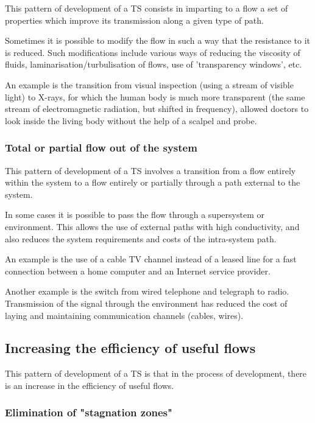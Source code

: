 \documentclass[a4paper,11pt]{article}
\begin{document}
This pattern of development of a TS consists in imparting to a flow a set of
properties which improve its transmission along a given type of path.

Sometimes it is possible to modify the flow in such a way that the resistance
to it is reduced. Such modifications include various ways of reducing the
viscosity of fluids, laminarisation/turbulisation of flows, use of
'transparency windows', etc.

An example is the transition from visual inspection (using a stream of visible
light) to X-rays, for which the human body is much more transparent (the same
stream of electromagnetic radiation, but shifted in frequency), allowed
doctors to look inside the living body without the help of a scalpel and
probe.

\subsubsection{Total or partial flow out of the system}

This pattern of development of a TS involves a transition from a flow entirely
within the system to a flow entirely or partially through a path external to
the system.

In some cases it is possible to pass the flow through a supersystem or
environment. This allows the use of external paths with high conductivity, and
also reduces the system requirements and costs of the intra-system path.

An example is the use of a cable TV channel instead of a leased line for a
fast connection between a home computer and an Internet service provider.

Another example is the switch from wired telephone and telegraph to radio.
Transmission of the signal through the environment has reduced the cost of
laying and maintaining communication channels (cables, wires).

\subsection{Increasing the efficiency of useful flows}

This pattern of development of a TS is that in the process of development,
there is an increase in the efficiency of useful flows.

\subsubsection{Elimination of "stagnation zones"}
\end{document}
